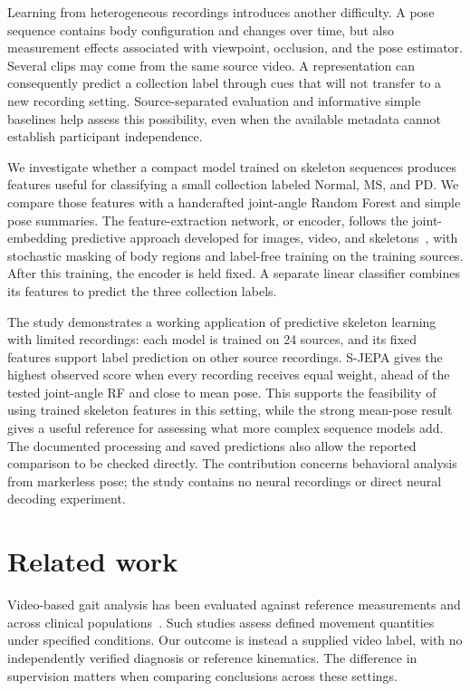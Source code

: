 \documentclass[10pt,twocolumn,letterpaper]{article}
\begin{document}
Learning from heterogeneous recordings introduces another difficulty. A pose sequence contains body configuration and changes over time, but also measurement effects associated with viewpoint, occlusion, and the pose estimator. Several clips may come from the same source video. A representation can consequently predict a collection label through cues that will not transfer to a new recording setting. Source-separated evaluation and informative simple baselines help assess this possibility, even when the available metadata cannot establish participant independence.

We investigate whether a compact model trained on skeleton sequences produces features useful for classifying a small collection labeled Normal, MS, and PD. We compare those features with a handcrafted joint-angle Random Forest and simple pose summaries. The feature-extraction network, or encoder, follows the joint-embedding predictive approach developed for images, video, and skeletons~\cite{ijepa,vjepa,sjepa}, with stochastic masking of body regions and label-free training on the training sources. After this training, the encoder is held fixed. A separate linear classifier combines its features to predict the three collection labels.

The study demonstrates a working application of predictive skeleton learning with limited recordings: each model is trained on 24 sources, and its fixed features support label prediction on other source recordings. S-JEPA gives the highest observed score when every recording receives equal weight, ahead of the tested joint-angle RF and close to mean pose. This supports the feasibility of using trained skeleton features in this setting, while the strong mean-pose result gives a useful reference for assessing what more complex sequence models add. The documented processing and saved predictions also allow the reported comparison to be checked directly. The contribution concerns behavioral analysis from markerless pose; the study contains no neural recordings or direct neural decoding experiment.

\section{Related work}
Video-based gait analysis has been evaluated against reference measurements and across clinical populations~\cite{stenum2021,stenum2024}. Such studies assess defined movement quantities under specified conditions. Our outcome is instead a supplied video label, with no independently verified diagnosis or reference kinematics. The difference in supervision matters when comparing conclusions across these settings.
\end{document}
